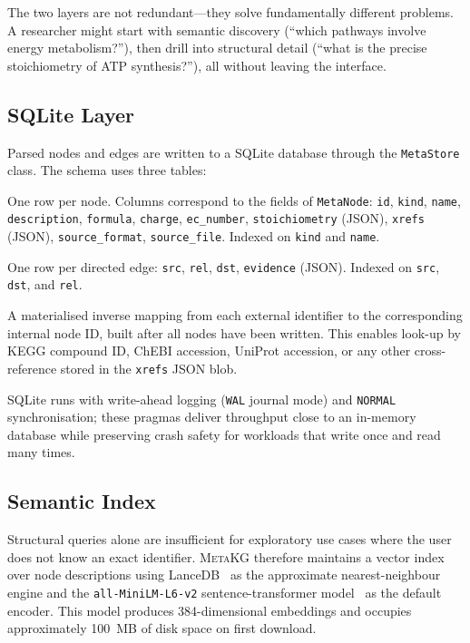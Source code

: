 \documentclass[10pt]{article}
\begin{document}
The two layers are not redundant---they solve fundamentally different
problems. A researcher might start with semantic discovery (``which pathways
involve energy metabolism?''), then drill into structural detail (``what is the
precise stoichiometry of ATP synthesis?''), all without leaving the interface.

\subsection{SQLite Layer}

Parsed nodes and edges are written to a SQLite database through the
\texttt{MetaStore} class. The schema uses three tables:

\begin{description}[leftmargin=*,itemsep=2pt]
  \item[\texttt{meta\_nodes}] One row per node. Columns correspond to the
    fields of \texttt{MetaNode}: \texttt{id}, \texttt{kind}, \texttt{name},
    \texttt{description}, \texttt{formula}, \texttt{charge},
    \texttt{ec\_number}, \texttt{stoichiometry} (JSON), \texttt{xrefs}
    (JSON), \texttt{source\_format}, \texttt{source\_file}. Indexed on
    \texttt{kind} and \texttt{name}.
  \item[\texttt{meta\_edges}] One row per directed edge: \texttt{src},
    \texttt{rel}, \texttt{dst}, \texttt{evidence} (JSON). Indexed on
    \texttt{src}, \texttt{dst}, and \texttt{rel}.
  \item[\texttt{xref\_index}] A materialised inverse mapping from each
    external identifier to the corresponding internal node ID, built after
    all nodes have been written. This enables look-up by KEGG compound ID,
    ChEBI accession, UniProt accession, or any other cross-reference stored
    in the \texttt{xrefs} JSON blob.
\end{description}

SQLite runs with write-ahead logging (\texttt{WAL} journal mode) and
\texttt{NORMAL} synchronisation; these pragmas deliver throughput close to an
in-memory database while preserving crash safety for workloads that write once
and read many times.

\subsection{Semantic Index}

Structural queries alone are insufficient for exploratory use cases where the
user does not know an exact identifier. \textsc{MetaKG} therefore maintains a
vector index over node descriptions using LanceDB~\citep{lancedb2023} as the
approximate nearest-neighbour engine and the \texttt{all-MiniLM-L6-v2}
sentence-transformer model~\citep{reimers2019sbert} as the default encoder.
This model produces 384-dimensional embeddings and occupies approximately
100~MB of disk space on first download.
\end{document}
